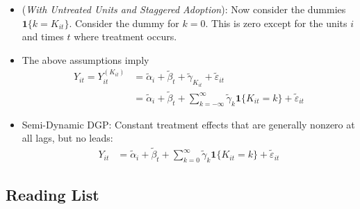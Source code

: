 \documentclass[12pt]{article}
\theoremstyle{plain}
\theoremstyle{definition}
\theoremstyle{remark}
\begin{document}
\begin{itemize}
  \item (\emph{With Untreated Units and Staggered Adoption}):
    Now consider the dummies $\mathbf{1}\{k=K_{it}\}$.
    Consider the dummy for $k=0$.
    This is zero except for the units $i$ and times $t$ where treatment
    occurs.
\end{itemize}




\begin{itemize}
  \item
    The above assumptions imply
    \begin{align*}
      Y_{it}
      =
      Y_{it}^{(K_{it})}
      &=
      \tilde{\alpha}_i
      +
      \tilde{\beta}_t
      +
      \tilde{\gamma}_{K_{it}}
      +
      \tilde{\varepsilon}_{it}
      \\
      &=
      \tilde{\alpha}_i
      +
      \tilde{\beta}_t
      +
      \sum_{k=-\infty}^\infty
      \tilde{\gamma}_k
      \mathbf{1}\{K_{it}=k\}
      +
      \tilde{\varepsilon}_{it}
    \end{align*}



  \item Semi-Dynamic DGP:
    Constant treatment effects that are generally nonzero at all lags,
    but no leads:
    \begin{align*}
      Y_{it}
      &=
      \tilde{\alpha}_i
      +
      \tilde{\beta}_t
      +
      \sum_{k=0}^\infty
      \tilde{\gamma}_k
      \mathbf{1}\{K_{it}=k\}
      +
      \tilde{\varepsilon}_{it}
    \end{align*}



\end{itemize}




\clearpage
\subsection{Reading List}
\end{document}
